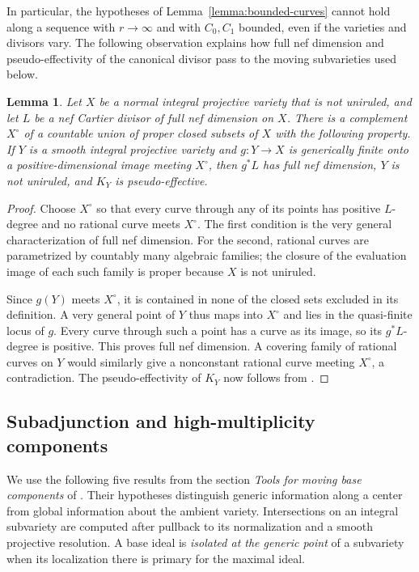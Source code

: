 \documentclass[12pt,a4paper,psamsfonts]{amsart}
\theoremstyle{definition}
\theoremstyle{plain}
\newtheorem{lemma}{Lemma}[section]
\begin{document}
In particular, the hypotheses of Lemma~\ref{lemma:bounded-curves}
cannot hold along a sequence with $r\to\infty$ and with $C_0,C_1$
bounded, even if the varieties and divisors vary.  The following
observation explains how full nef dimension and pseudo-effectivity
of the canonical divisor pass to the moving subvarieties used below.

\begin{lemma}
\label{j:very-general-images}
Let $X$ be a normal integral projective variety that is not uniruled,
and let $L$ be a nef Cartier divisor of full nef dimension on $X$.
There is a complement $X^\circ$ of a countable union of proper
closed subsets of $X$ with the following property.  If $Y$ is a
smooth integral projective variety and $g:Y\to X$ is generically
finite onto a positive-dimensional image meeting $X^\circ$, then
$g^*L$ has full nef dimension, $Y$ is not uniruled, and $K_Y$ is
pseudo-effective.
\end{lemma}

\begin{proof}
Choose $X^\circ$ so that every curve through any of its points has
positive $L$-degree and no rational curve meets $X^\circ$.  The first
condition is the very general characterization of full nef
dimension.  For the second, rational curves are parametrized by
countably many algebraic families; the closure of the evaluation
image of each such family is proper because $X$ is not uniruled.

Since $g(Y)$ meets $X^\circ$, it is contained in none of the closed
sets excluded in its definition.  A very general point of $Y$ thus
maps into $X^\circ$ and lies in the quasi-finite locus of $g$.
Every curve through such a point has a curve as its image, so its
$g^*L$-degree is positive.  This proves full nef dimension.  A
covering family of rational curves on $Y$ would similarly give a
nonconstant rational curve meeting $X^\circ$, a contradiction.
The pseudo-effectivity of $K_Y$ now follows from \cite{BDPP}.
\end{proof}

\subsection{Subadjunction and high-multiplicity components}

We use the following five results from the section
\emph{Tools for moving base components} of \cite{LA}.  Their
hypotheses distinguish generic information along a center from
global information about the ambient variety.  Intersections on
an integral subvariety are computed after pullback to its
normalization and a smooth projective resolution.  A base ideal
is \emph{isolated at the generic point} of a subvariety when its
localization there is primary for the maximal ideal.
\end{document}
